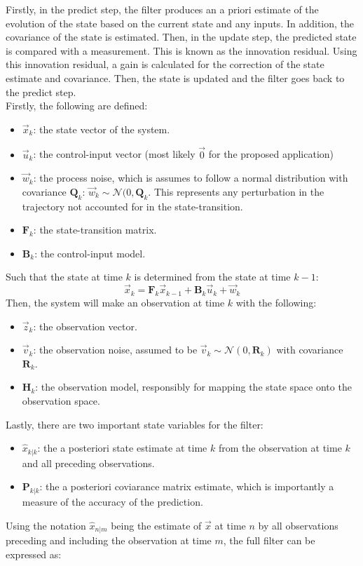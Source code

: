 Firstly, in the predict step, the filter produces an a priori estimate of the evolution of the state based on the current state and any inputs. In addition, the covariance of the state is estimated. Then, in the update step, the predicted state is compared with a measurement. This is known as the innovation residual. Using this innovation residual, a gain is calculated for the correction of the state estimate and covariance. Then, the state is updated and the filter goes back to the predict step.\\

Firstly, the following are defined:
\begin{itemize}
    \item $\vec{x}_k$: the state vector of the system.
    \item $\vec{u}_k$: the control-input vector (most likely $\vec{0}$ for the proposed application)
    \item $\vec{w}_k$: the process noise, which is assumes to follow a normal distribution with covariance $\mathbf{Q}_k$: $\vec{w}_k\sim\mathcal{N}(0, \mathbf{Q}_k$. This represents any perturbation in the trajectory not accounted for in the state-transition.
    \item $\mathbf{F}_k$: the state-transition matrix.
    \item $\mathbf{B}_k$: the control-input model.
\end{itemize}
Such that the state at time $k$ is determined from the state at time $k-1$:
\begin{equation}
    \vec{x}_k = \mathbf{F}_k \vec{x}_{k-1} + \mathbf{B}_k \vec{u}_k + \vec{w}_k
\end{equation}
Then, the system will make an observation at time $k$ with the following:
\begin{itemize}
    \item $\vec{z}_k$: the observation vector.
    \item $\vec{v}_k$: the observation noise, assumed to be $\vec{v}_k\sim\mathcal{N}(0, \mathbf{R}_k)$ with covariance $\mathbf{R}_k$.
    \item $\mathbf{H}_k$: the observation model, responsibly for mapping the state space onto the observation space.
\end{itemize}
Lastly, there are two important state variables for the filter:
\begin{itemize}
    \item $\hat{x}_{k|k}$: the a posteriori state estimate at time $k$ from the observation at time $k$ and all preceding observations.
    \item $\mathbf{P}_{k|k}$: the a posteriori coviarance matrix estimate, which is importantly a measure of the accuracy of the prediction.
\end{itemize}
Using the notation $\hat{x}_{n|m}$ being the estimate of $\vec{x}$ at time $n$ by all observations preceding and including the observation at time $m$, the full filter can be expressed as:\\

